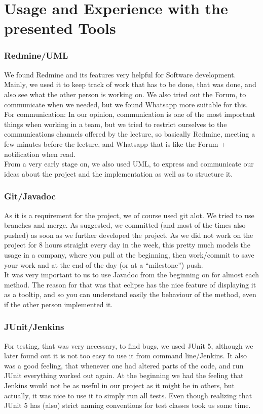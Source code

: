 \section{Usage and Experience with the presented Tools} 
\begin{frame}[fragile=singleslide]
	\frametitle{Redmine/UML}
	We found Redmine and its features very helpful for Software development. Mainly, we used it to keep track of work that has to be done, that was done, and also see what the other person is working on. We also tried out the Forum, to communicate when we needed, but we found Whatsapp more suitable for this.\\
	For communication: In our opinion, communication is one of the most important things when working in a team, but we tried to restrict ourselves to the communications channels offered by the lecture, so basically Redmine, meeting a few minutes before the lecture, and Whatsapp that is like the Forum + notification when read.\\
	From a very early stage on, we also used UML, to express and communicate our ideas about the project and the implementation as well as to structure it.
  \end{frame}
	
	\begin{frame}[fragile=singleslide]
		\frametitle{Git/Javadoc}
	As it is a requirement for the project, we of course used git alot. We tried to use branches and merge. As suggested, we committed (and most of the times also pushed) as soon as we further developed the project. As we did not work on the project for 8 hours straight every day in the week, this pretty much models the usage in a company, where you pull at the beginning, then work/commit to save your work and at the end of the day (or at a ``milestone'') push.\\
	It was very important to us to use Javadoc from the beginning on for almost each method. The reason for that was that eclipse has the nice feature of displaying it as a tooltip, and so you can understand easily the behaviour of the method, even if the other person implemented it.
  \end{frame}
	
	\begin{frame}[fragile=singleslide]
			\frametitle{JUnit/Jenkins}
	For testing, that was very necessary, to find bugs, we used JUnit 5, although we later found out it is not too easy to use it from command line/Jenkins. It also was a good feeling, that whenever one had altered parts of the code, and run JUnit everything worked out again. At the beginning we had the feeling that Jenkins would not be as useful in our project as it might be in others, but actually, it was nice to use it to simply run all tests. Even though realizing that JUnit 5 has (also) strict naming conventions for test classes took us some time.
  \end{frame}